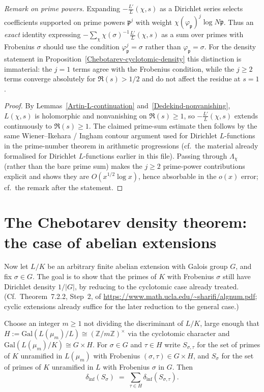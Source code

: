 {\emph{Remark on prime powers.}
Expanding $-\frac{L'}{L}(\chi,s)$ as a Dirichlet series selects coefficients supported on
prime powers $\mathfrak{p}^j$ with weight $\chi(\varphi_{\mathfrak{p}})^j\log N\mathfrak{p}$.
Thus an \emph{exact} identity expressing $-\sum_\chi \chi(\sigma)^{-1}\frac{L'}{L}(\chi,s)$ as a
sum over primes with Frobenius $\sigma$ should use the condition $\varphi_{\mathfrak{p}}^j=\sigma$
rather than $\varphi_{\mathfrak{p}}=\sigma$.  For the density statement in
Proposition~\ref{Chebotarev-cyclotomic-density} this distinction is immaterial: the $j=1$ terms
agree with the Frobenius condition, while the $j\geq 2$ terms converge absolutely for
$\Re(s)>1/2$ and do not affect the residue at $s=1$.

\begin{proof}
By Lemmas~\ref{Artin-L-continuation} and~\ref{Dedekind-nonvanishing}, $L(\chi,s)$ is holomorphic
and nonvanishing on $\Re(s)\geq 1$, so $-\frac{L'}{L}(\chi,s)$ extends continuously to
$\Re(s)\geq 1$.  The claimed prime-sum estimate then follows by the same Wiener--Ikehara /
Ingham contour argument used for Dirichlet $L$-functions in the prime-number theorem in
arithmetic progressions (cf.\ the material already formalised for Dirichlet $L$-functions
earlier in this file).  Passing through $\Lambda_\chi$ (rather than the bare prime sum) makes
the $j\geq 2$ prime-power contributions explicit and shows they are $O(x^{1/2}\log x)$,
hence absorbable in the $o(x)$ error; cf.\ the remark after the statement.
\end{proof}

\section{The Chebotarev density theorem: the case of abelian extensions}

Now let $L/K$ be an arbitrary finite abelian extension with Galois group $G$, and fix
$\sigma \in G$.  The goal is to show that the primes of $K$ with Frobenius $\sigma$ still have
Dirichlet density $1/|G|$, by reducing to the cyclotomic case already treated.
(Cf.\ Theorem~7.2.2, Step~2, of \url{https://www.math.ucla.edu/~sharifi/algnum.pdf}; cyclic
extensions already suffice for the later reduction to the general case.)

\begin{lemma}\label{Chebotarev-abelian-crossing}
Choose an integer $m\geq 1$ not dividing the discriminant of $L/K$, large enough that
$H := \mathrm{Gal}(L(\mu_m)/L) \cong (\mathbb{Z}/m\mathbb{Z})^\times$ via the cyclotomic character
and $\mathrm{Gal}(L(\mu_m)/K) \cong G \times H$.  For $\sigma\in G$ and $\tau\in H$ write
$S_{\sigma,\tau}$ for the set of primes of $K$ unramified in $L(\mu_m)$ with Frobenius
$(\sigma,\tau)\in G\times H$, and $S_\sigma$ for the set of primes of $K$ unramified in $L$
with Frobenius $\sigma$ in $G$.  Then
\[
\delta_{\mathrm{inf}}(S_\sigma) \;=\; \sum_{\tau\in H} \delta_{\mathrm{inf}}(S_{\sigma,\tau}).
\]
\end{lemma}

}
